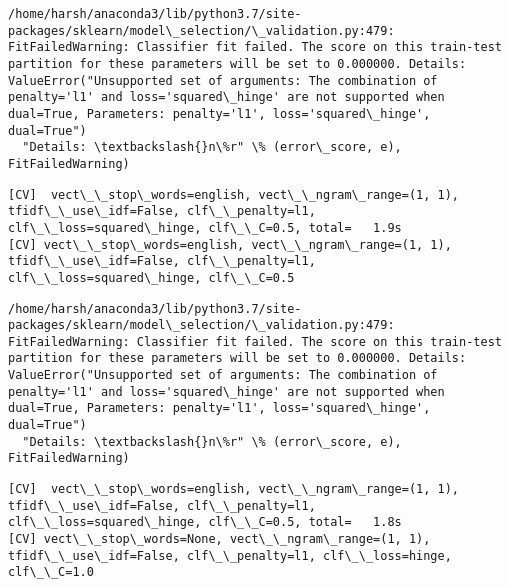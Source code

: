\documentclass[11pt]{article}
\begin{document}
    \begin{Verbatim}[commandchars=\\\{\}]
/home/harsh/anaconda3/lib/python3.7/site-packages/sklearn/model\_selection/\_validation.py:479: FitFailedWarning: Classifier fit failed. The score on this train-test partition for these parameters will be set to 0.000000. Details: 
ValueError("Unsupported set of arguments: The combination of penalty='l1' and loss='squared\_hinge' are not supported when dual=True, Parameters: penalty='l1', loss='squared\_hinge', dual=True")
  "Details: \textbackslash{}n\%r" \% (error\_score, e), FitFailedWarning)

    \end{Verbatim}

    \begin{Verbatim}[commandchars=\\\{\}]
[CV]  vect\_\_stop\_words=english, vect\_\_ngram\_range=(1, 1), tfidf\_\_use\_idf=False, clf\_\_penalty=l1, clf\_\_loss=squared\_hinge, clf\_\_C=0.5, total=   1.9s
[CV] vect\_\_stop\_words=english, vect\_\_ngram\_range=(1, 1), tfidf\_\_use\_idf=False, clf\_\_penalty=l1, clf\_\_loss=squared\_hinge, clf\_\_C=0.5 

    \end{Verbatim}

    \begin{Verbatim}[commandchars=\\\{\}]
/home/harsh/anaconda3/lib/python3.7/site-packages/sklearn/model\_selection/\_validation.py:479: FitFailedWarning: Classifier fit failed. The score on this train-test partition for these parameters will be set to 0.000000. Details: 
ValueError("Unsupported set of arguments: The combination of penalty='l1' and loss='squared\_hinge' are not supported when dual=True, Parameters: penalty='l1', loss='squared\_hinge', dual=True")
  "Details: \textbackslash{}n\%r" \% (error\_score, e), FitFailedWarning)

    \end{Verbatim}

    \begin{Verbatim}[commandchars=\\\{\}]
[CV]  vect\_\_stop\_words=english, vect\_\_ngram\_range=(1, 1), tfidf\_\_use\_idf=False, clf\_\_penalty=l1, clf\_\_loss=squared\_hinge, clf\_\_C=0.5, total=   1.8s
[CV] vect\_\_stop\_words=None, vect\_\_ngram\_range=(1, 1), tfidf\_\_use\_idf=False, clf\_\_penalty=l1, clf\_\_loss=hinge, clf\_\_C=1.0 

    \end{Verbatim}
\end{document}
